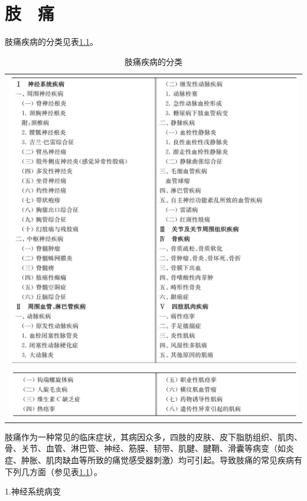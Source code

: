 \chapter{肢　痛}

肢痛疾病的分类见表\ref{tab45-1}。

\begin{longtable}{c}
 \caption{肢痛疾病的分类}
 \label{tab45-1}
 \endfirsthead
 \caption[]{肢痛疾病的分类}
 \endhead
 \includegraphics[width=\textwidth,height=\textheight,keepaspectratio]{./images/Image00272.jpg}\\
 \includegraphics[width=\textwidth,height=\textheight,keepaspectratio]{./images/Image00273.jpg}
 \end{longtable}

肢痛作为一种常见的临床症状，其病因众多，四肢的皮肤、皮下脂肪组织、肌肉、骨、关节、血管、淋巴管、神经、筋膜、韧带、肌腱、腱鞘、滑囊等病变（如炎症、肿胀、肌肉缺血等所致的痛觉感受器刺激）均可引起。导致肢痛的常见疾病有下列几方面（参见表\ref{tab45-1}）。

1.神经系统病变%

